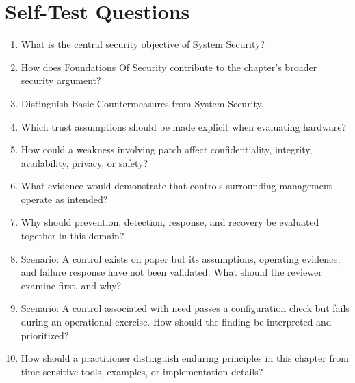 \documentclass[11pt]{article}
\begin{document}
\section*{Self-Test Questions}
\begin{enumerate}
\item What is the central security objective of System Security?
\item How does Foundations Of Security contribute to the chapter's broader security argument?
\item Distinguish Basic Countermeasures from System Security.
\item Which trust assumptions should be made explicit when evaluating hardware?
\item How could a weakness involving patch affect confidentiality, integrity, availability, privacy, or safety?
\item What evidence would demonstrate that controls surrounding management operate as intended?
\item Why should prevention, detection, response, and recovery be evaluated together in this domain?
\item Scenario: A control exists on paper but its assumptions, operating evidence, and failure response have not been validated. What should the reviewer examine first, and why?
\item Scenario: A control associated with need passes a configuration check but fails during an operational exercise. How should the finding be interpreted and prioritized?
\item How should a practitioner distinguish enduring principles in this chapter from time-sensitive tools, examples, or implementation details?
\end{enumerate}
\end{document}
